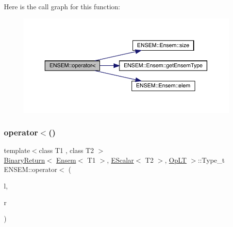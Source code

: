 Here is the call graph for this function\+:\nopagebreak
\begin{figure}[H]
\begin{center}
\leavevmode
\includegraphics[width=350pt]{d1/d9e/group__eensem_ga1d5f68e8b9ac25bf882bfdfda50cf24b_cgraph}
\end{center}
\end{figure}
\mbox{\label{group__eensem_ga4f6f9b0944034ade90afab94b38db470}} 
\subsubsection{\texorpdfstring{operator$<$()}{operator<()}\hspace{0.1cm}{\footnotesize\ttfamily [2/3]}}
{\footnotesize\ttfamily template$<$class T1 , class T2 $>$ \\
\mbox{\hyperlink{structENSEM_1_1BinaryReturn}{Binary\+Return}}$<$ \mbox{\hyperlink{classENSEM_1_1Ensem}{Ensem}}$<$ T1 $>$, \mbox{\hyperlink{classENSEM_1_1EScalar}{E\+Scalar}}$<$ T2 $>$, \mbox{\hyperlink{structENSEM_1_1OpLT}{Op\+LT}} $>$\+::Type\+\_\+t E\+N\+S\+E\+M\+::operator$<$ (\begin{DoxyParamCaption}\item[{const \mbox{\hyperlink{classENSEM_1_1Ensem}{Ensem}}$<$ T1 $>$ \&}]{l,  }\item[{const \mbox{\hyperlink{classENSEM_1_1EScalar}{E\+Scalar}}$<$ T2 $>$ \&}]{r }\end{DoxyParamCaption})\hspace{0.3cm}{\ttfamily [inline]}}

